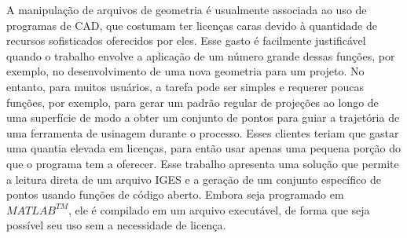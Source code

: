 	A manipula\c{c}{\~a}o de arquivos de geometria {\'e} usualmente associada ao uso de programas de CAD, que costumam ter licen\c{c}as caras devido {\`a} quantidade de recursos sofisticados oferecidos por eles. Esse gasto {\'e} facilmente justific{\'a}vel quando o trabalho envolve a aplica\c{c}{\~a}o de um n{\'u}mero grande dessas fun\c{c}{\~o}es, por exemplo, no desenvolvimento de uma nova geometria para um projeto. No entanto, para muitos usu{\'a}rios, a tarefa pode ser simples e requerer poucas fun\c{c}{\~o}es, por exemplo, para gerar um padr{\~a}o regular de proje\c{c}{\~o}es ao longo de uma superf{\'i}cie de modo a obter um conjunto de pontos para guiar a trajet{\'o}ria de uma ferramenta de usinagem durante o processo. Esses clientes teriam que gastar uma quantia elevada em licen\c{c}as, para ent{\~a}o usar apenas uma pequena por\c{c}{\~a}o do que o programa tem a oferecer.
	Esse trabalho apresenta uma solu\c{c}{\~a}o que permite a leitura direta de um arquivo IGES e a gera\c{c}{\~a}o de um conjunto espec{\'i}fico de pontos usando fun\c{c}{\~o}es de c{\'o}digo aberto. Embora seja programado em $MATLAB^{TM}$, ele {\'e} compilado em um arquivo execut{\'a}vel, de forma que seja poss{\'i}vel seu uso sem a necessidade de licen\c{c}a.